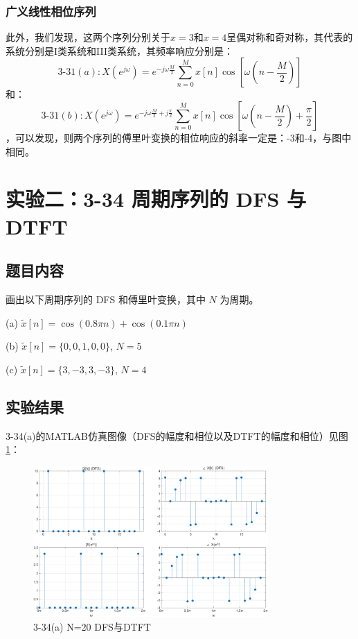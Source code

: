 \documentclass[UTF8,12pt,a4paper]{ctexart}
\begin{document}
\subsubsection{广义线性相位序列}

此外，我们发现，这两个序列分别关于$x=3$和$x=4$呈偶对称和奇对称，其代表的系统分别是I类系统和III类系统，其频率响应分别是：
$$3\text{-}31(a): X(e^{j\omega})=e^{-j\omega\frac{M}{2}}\sum_{n=0}^{M}x[n]\cos[\omega(n-\frac{M}{2})]$$
和：
$$3\text{-}31(b): X(e^{j\omega})=e^{-j\omega\frac{M}{2}+j\frac{\pi}{2}}\sum_{n=0}^{M}x[n]\cos[\omega(n-\frac{M}{2})+\frac{\pi}{2}]$$
，可以发现，则两个序列的傅里叶变换的相位响应的斜率一定是：-3和-4，与图中相同。

\section{实验二：3-34 周期序列的 DFS 与 DTFT}

\subsection{题目内容}

画出以下周期序列的 DFS 和傅里叶变换，其中 $N$ 为周期。

(a) $\tilde{x}[n] = \cos(0.8\pi n) + \cos(0.1\pi n)$

(b) $\tilde{x}[n] = \{0,0,1,0,0\}$, $N=5$

(c) $\tilde{x}[n] = \{3,-3,3,-3\}$, $N=4$

\subsection{实验结果}

3-34(a)的MATLAB仿真图像（DFS的幅度和相位以及DTFT的幅度和相位）见图\ref{fig:3-34a}：

\begin{figure}[htbp]
    \centering
    \includegraphics[width=0.8\textwidth]{3-34(a) N=20.png}
    \caption{3-34(a) N=20 DFS与DTFT}
    \label{fig:3-34a}
\end{figure}
\end{document}

